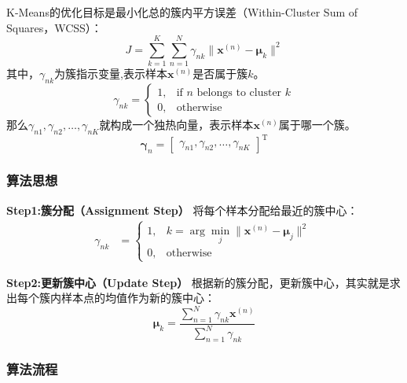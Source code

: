 \documentclass[withoutpreface,bwprint]{NoteBook}
\begin{document}
K-Means的优化目标是最小化总的簇内平方误差（Within-Cluster Sum of Squares，WCSS）：
\begin{equation}
    \label{eq:K-Means的优化目标}
    J = \sum_{k=1}^{K} \sum_{n=1}^{N} \gamma_{nk} \| \mathbf{x}^{(n)} - \bm{\mu}_k \|^2
\end{equation}
其中，$\gamma_{nk}$为簇指示变量,表示样本$\mathbf{x}^{(n)}$是否属于簇$k$。
\begin{equation}
    \label{eq:gamma_nk}
    \gamma_{nk} = 
    \begin{cases}
        1, & \text{if } n \text{ belongs to cluster } k \\
        0, & \text{otherwise}
    \end{cases}
\end{equation}
那么$\gamma_{n1}, \gamma_{n2}, \ldots, \gamma_{nK}$就构成一个独热向量，表示样本$\mathbf{x}^{(n)}$属于哪一个簇。
$$
\bm{\gamma}_n =\begin{bmatrix}
    \gamma_{n1}, \gamma_{n2}, \ldots, \gamma_{nK}
\end{bmatrix}^\mathrm{T} 
$$

\subsubsection{算法思想}
\textbf{Step1:簇分配（Assignment Step）}
将每个样本分配给最近的簇中心：
\begin{align}
    \label{eq:KMeans_Assignment_Step}
    \gamma_{nk} &= 
    \begin{cases}
        1, & k = \arg \min_{j} \| \mathbf{x}^{(n)} - \bm{\mu}_j \|^2 \\
        0, & \text{otherwise}
    \end{cases}
\end{align}

\textbf{Step2:更新簇中心（Update Step）}
根据新的簇分配，更新簇中心，其实就是求出每个簇内样本点的均值作为新的簇中心：
\begin{equation}
    \label{eq:KMeans_Update_Step}
    \bm{\mu}_k = \frac{\sum_{n=1}^{N} \gamma_{nk} \mathbf{x}^{(n)}}{\sum_{n=1}^{N} \gamma_{nk}}
\end{equation}

\subsubsection{算法流程}
\end{document}
